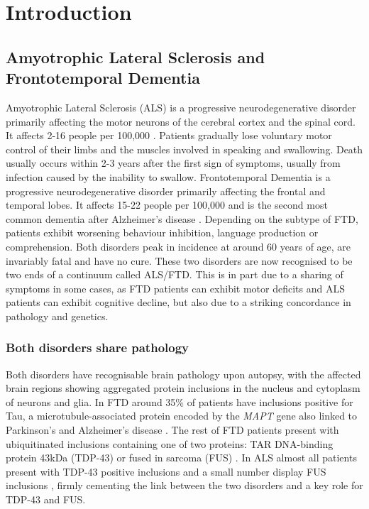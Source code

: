 
\chapter{Introduction}

\section{Amyotrophic Lateral Sclerosis and Frontotemporal Dementia} %

Amyotrophic Lateral Sclerosis (ALS) is a progressive neurodegenerative disorder primarily affecting the motor neurons of the cerebral cortex and the spinal cord. It affects 2-16 people per 100,000 \citep{Logroscino2010}. Patients gradually lose voluntary motor control of their limbs and the muscles involved in speaking and swallowing. Death usually occurs within 2-3 years after the first sign of symptoms, usually from infection caused by the inability to swallow. Frontotemporal Dementia is a progressive neurodegenerative disorder primarily affecting the frontal and temporal lobes. It affects 15-22 people per 100,000 and is the second most common dementia after Alzheimer's disease \citep{Onyike2013}. Depending on the subtype of FTD, patients exhibit worsening behaviour inhibition, language production or comprehension. Both disorders peak in incidence at around 60 years of age, are invariably fatal and have no cure. These two disorders are now recognised to be two ends of a continuum called ALS/FTD. This is in part due to a sharing of symptoms in some cases, as FTD patients can exhibit motor deficits and ALS patients can exhibit cognitive decline, but also due to a striking concordance in pathology and genetics. 

\subsection{Both disorders share pathology}

Both disorders have recognisable brain pathology upon autopsy, with the affected brain regions showing aggregated protein inclusions in the nucleus and cytoplasm of neurons and glia. In FTD around 35\% of patients have inclusions positive for Tau, a microtubule-associated protein encoded by the \textit{MAPT} gene also linked to Parkinson's and Alzheimer's disease \citep{Rademakers2004}. The rest of FTD patients present with ubiquitinated inclusions containing one of two proteins: TAR DNA-binding protein 43kDa (TDP-43) \citep{Neumann2006-re} or fused in sarcoma (FUS) \citep{Neumann2009}. In ALS almost all patients present with TDP-43 positive inclusions \citep{Neumann2006-re} and a small number display FUS inclusions \citep{Vance2009-ye}, firmly cementing the link between the two disorders and a key role for TDP-43 and FUS.


